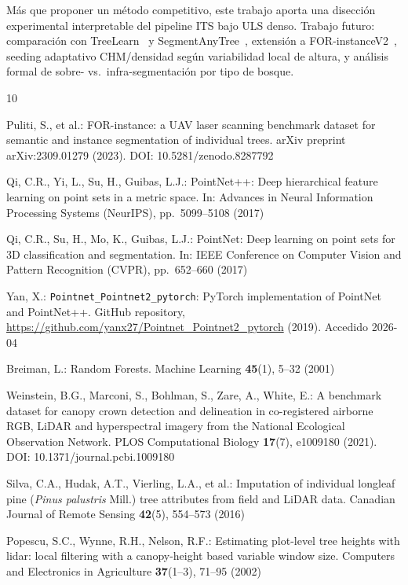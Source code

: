 \documentclass{cys}
\begin{document}
Más que proponer un método competitivo, este trabajo aporta una disección experimental interpretable del pipeline ITS bajo ULS denso. Trabajo futuro: comparación con TreeLearn~\cite{henrich2024} y SegmentAnyTree~\cite{wielgosz2024}, extensión a FOR-instanceV2~\cite{xiang2025}, seeding adaptativo CHM/densidad según variabilidad local de altura, y análisis formal de sobre- vs.\ infra-segmentación por tipo de bosque.
\begin{thebibliography}{10}

Puliti, S., et al.:
FOR-instance: a UAV laser scanning benchmark dataset for semantic and instance segmentation of individual trees.
arXiv preprint arXiv:2309.01279 (2023).
DOI: 10.5281/zenodo.8287792

Qi, C.R., Yi, L., Su, H., Guibas, L.J.:
PointNet++: Deep hierarchical feature learning on point sets in a metric space.
In: Advances in Neural Information Processing Systems (NeurIPS), pp.~5099--5108 (2017)

Qi, C.R., Su, H., Mo, K., Guibas, L.J.:
PointNet: Deep learning on point sets for 3D classification and segmentation.
In: IEEE Conference on Computer Vision and Pattern Recognition (CVPR), pp.~652--660 (2017)

Yan, X.:
\texttt{Pointnet\_Pointnet2\_pytorch}: PyTorch implementation of PointNet and PointNet++.
GitHub repository, \url{https://github.com/yanx27/Pointnet_Pointnet2_pytorch} (2019). Accedido 2026-04

Breiman, L.:
Random Forests.
Machine Learning \textbf{45}(1), 5--32 (2001)

Weinstein, B.G., Marconi, S., Bohlman, S., Zare, A., White, E.:
A benchmark dataset for canopy crown detection and delineation in co-registered airborne RGB, LiDAR and hyperspectral imagery from the National Ecological Observation Network.
PLOS Computational Biology \textbf{17}(7), e1009180 (2021).
DOI: 10.1371/journal.pcbi.1009180

Silva, C.A., Hudak, A.T., Vierling, L.A., et al.:
Imputation of individual longleaf pine (\emph{Pinus palustris} Mill.) tree attributes from field and LiDAR data.
Canadian Journal of Remote Sensing \textbf{42}(5), 554--573 (2016)

Popescu, S.C., Wynne, R.H., Nelson, R.F.:
Estimating plot-level tree heights with lidar: local filtering with a canopy-height based variable window size.
Computers and Electronics in Agriculture \textbf{37}(1--3), 71--95 (2002)


\end{thebibliography}
\end{document}
